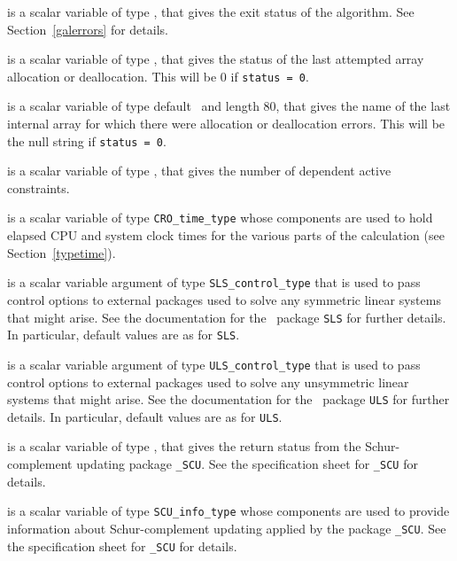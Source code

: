 \documentclass{galahad}
\newcommand{\packagename}{CRO}
\begin{document}
\begin{description}

 is a scalar variable of type \integer, that gives the
exit status of the algorithm.
See Section~\ref{galerrors}
for details.

 is a scalar variable of type \integer, that gives
the status of the last attempted array allocation or deallocation.
This will be 0 if {\tt status = 0}.

 is a scalar variable of type default \character\
and length 80, that  gives the name of the last internal array
for which there were allocation or deallocation errors.
This will be the null string if {\tt status = 0}.

 is a scalar variable of type \integer, that
gives the number of dependent active constraints.

 is a scalar variable of type {\tt \packagename\_time\_type}
whose components are used to hold elapsed CPU and system clock times for the
various parts of the calculation (see Section~\ref{typetime}).

 is a scalar variable argument of type
{\tt SLS\_control\_type} that is used to pass control
options to external packages used to solve any symmetric
linear systems that might arise.
See the documentation for the \galahad\ package {\tt SLS} for further details.
In particular, default values are as for {\tt SLS}.

 is a scalar variable argument of type
{\tt ULS\_control\_type} that is used to pass control
options to external packages used to solve any unsymmetric
linear systems that might arise.
See the documentation for the \galahad\ package {\tt ULS} for further details.
In particular, default values are as for {\tt ULS}.

 is a scalar variable of type \integer, that
gives the return status from the Schur-complement updating package
{\tt \libraryname\_SCU}.
See the specification sheet for {\tt \libraryname\_SCU} for details.

 is a scalar variable of type
{\tt SCU\_info\_type}
whose components are used to provide information about
Schur-complement updating applied by the package
{\tt \libraryname\_SCU}.
See the specification sheet for {\tt \libraryname\_SCU} for details.

\end{description}
\end{document}
